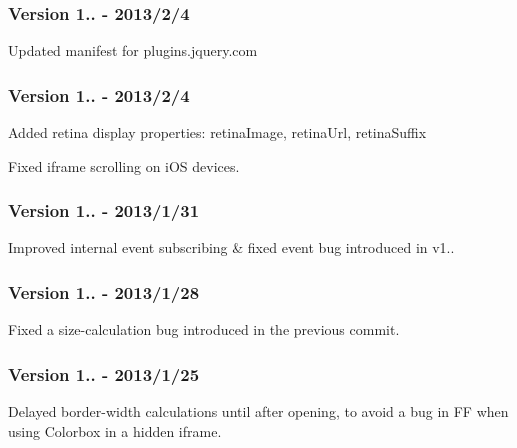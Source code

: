\subsubsection*{Version 1.. -\/ 2013/2/4}


\begin{DoxyItemize}
\item Updated manifest for plugins.\-jquery.\-com
\end{DoxyItemize}

\subsubsection*{Version 1.. -\/ 2013/2/4}


\begin{DoxyItemize}
\item Added retina display properties\-: retina\-Image, retina\-Url, retina\-Suffix
\item Fixed iframe scrolling on i\-O\-S devices.
\end{DoxyItemize}

\subsubsection*{Version 1.. -\/ 2013/1/31}


\begin{DoxyItemize}
\item Improved internal event subscribing \& fixed event bug introduced in v1..
\end{DoxyItemize}

\subsubsection*{Version 1.. -\/ 2013/1/28}


\begin{DoxyItemize}
\item Fixed a size-\/calculation bug introduced in the previous commit.
\end{DoxyItemize}

\subsubsection*{Version 1.. -\/ 2013/1/25}


\begin{DoxyItemize}
\item Delayed border-\/width calculations until after opening, to avoid a bug in F\-F when using Colorbox in a hidden iframe.
\end{DoxyItemize}

